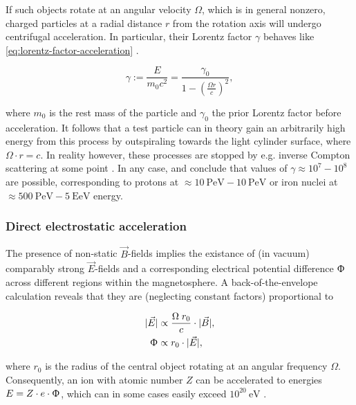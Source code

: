 If such objects rotate at an angular velocity $\Omega$, which is in general nonzero, charged particles at a radial distance $r$ from the rotation axis will undergo
centrifugal acceleration. In particular, their Lorentz factor $\gamma$ behaves like \autoref{eq:lorentz-factor-acceleration} \cite{rieger1999particle}.

\begin{equation}
\label{eq:lorentz-factor-acceleration}
\gamma := \frac{E}{m_0 c^2} = \frac{\gamma_0}{1 - \left(\frac{\Omega r}{c}\right)^2},
\end{equation}

where $m_0$ is the rest mass of the particle and $\gamma_0$ the prior Lorentz factor before acceleration. It follows that a test particle can in theory gain an
arbitrarily high energy from this process by outspiraling towards the light cylinder surface, where $\Omega\cdot r = c$. In reality however, these processes are
stopped by e.g. inverse Compton scattering at some point \cite{osmanov2007efficiency}. In any case, \cite{rieger1999particle} and \cite{osmanov2007efficiency}
conclude that values of $\gamma \approx 10^7-10^8$ are possible, corresponding to protons at $\approx\SI{10}{\peta\electronvolt}-\SI{10}{\peta\electronvolt}$ or 
iron nuclei at $\approx\SI{500}{\peta\electronvolt}-\SI{5}{\exa\electronvolt}$ energy.

\subsubsection{Direct electrostatic acceleration}
\label{sssec:cr-electrostatic-acceleration}

The presence of non-static $\vec{B}$-fields implies the existance of (in vacuum) comparably strong $\vec{E}$-fields and a corresponding electrical potential 
difference $\Upphi$ across different regions within the magnetosphere. A back-of-the-envelope calculation reveals that they are (neglecting constant factors) 
proportional to

\begin{align}
|\vec{E}| &\propto \frac{\Omega\;r_0}{c} \cdot |\vec{B}|, \\
\Upphi &\propto r_0 \cdot |\vec{E}|,
\end{align}

where $r_0$ is the radius of the central object rotating at an angular frequency $\Omega$. Consequently, an ion with atomic number $Z$ can be accelerated to 
energies $E = Z \cdot e \cdot \Upphi$, which can in some cases easily exceed $10^{20}\SI{}{\electronvolt}$ \cite{rieger2009cosmic}. 

